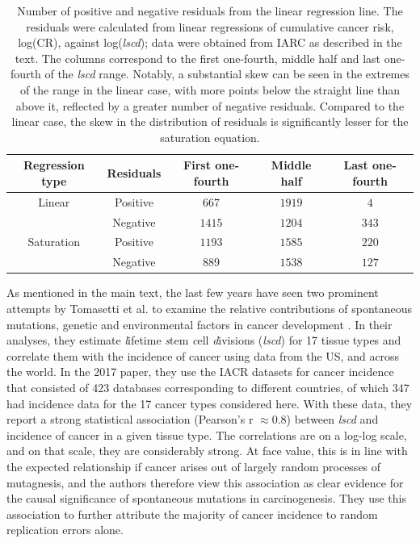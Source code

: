 \documentclass[10pt,twocolumn,twoside]{article}
\begin{document}
\begin{refsection}
		\begin{table}[tbhp]
			\centering
			\begin{tabular}[c]{ccccc}
				\textbf{Regression type} & \textbf{Residuals} & \textbf{First one-fourth} & \textbf{Middle half} & \textbf{Last one-fourth} \\
				\hline
				Linear & Positive & $667$ & $1919$ & $4$ \\
			  	& Negative & $1415$ & $1204$ & $343$ \\
				Saturation & Positive & $1193$ & $1585$ & $220$ \\
			 	& Negative & $889$ & $1538$ & $127$ \\
			 	\hline
			\end{tabular}
			\caption{Number of positive and negative residuals from the linear regression line. The residuals were calculated from linear regressions of cumulative cancer risk, log(CR), against log(\textit{lscd}); data were obtained from IARC as described in the text. The columns correspond to the first one-fourth, middle half and last one-fourth of the \textit{lscd} range. Notably, a substantial skew can be seen in the extremes of the range in the linear case, with more points below the straight line than above it, reflected by a greater number of negative residuals. Compared to the linear case, the skew in the distribution of residuals is significantly lesser for the saturation equation.}
			\label{Table S3.2}
		\end{table}

		As mentioned in the main text, the last few years have seen two prominent attempts by Tomasetti et al. to examine the relative contributions of spontaneous mutations, genetic and environmental factors in cancer development \cite{Tomasetti78, Tomasetti2017}.  In their analyses, they estimate \textit{l}ifetime \textit{s}tem \textit{c}ell \textit{d}ivisions (\textit{lscd}) for 17 tissue types and correlate them with the incidence of cancer using data from the US, and across the world. In the 2017 paper, they use the IACR datasets for cancer incidence that consisted of 423 databases corresponding to different countries, of which 347 had incidence data for the 17 cancer types considered here. With these data, they report a strong statistical association (Pearson’s r $\approx 0.8$) between \textit{lscd} and incidence of cancer in a given tissue type. The correlations are on a log-log scale, and on that scale, they are considerably strong. At face value, this is in line with the expected relationship if cancer arises out of largely random processes of mutagnesis, and the authors therefore view this association as clear evidence for the causal significance of spontaneous mutations in carcinogenesis. They use this association to further attribute the majority of cancer incidence to random replication errors alone.


\end{refsection}
\end{document}
